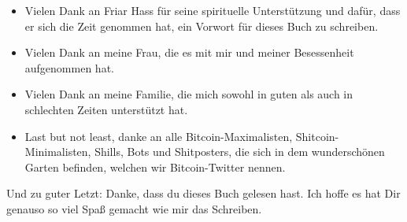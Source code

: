 \begin{itemize}
  \item Vielen Dank an Friar Hass für seine spirituelle Unterstützung und dafür, dass er sich die Zeit genommen hat, ein Vorwort für dieses Buch zu schreiben.
  \item Vielen Dank an meine Frau, die es mit mir und meiner Besessenheit aufgenommen hat.
  \item Vielen Dank an meine Familie, die mich sowohl in guten als auch in schlechten Zeiten unterstützt hat.
  \item Last but not least, danke an alle Bitcoin-Maximalisten, Shitcoin-Minimalisten, Shills, Bots und Shitposters, die sich in dem wunderschönen Garten befinden, welchen wir Bitcoin-Twitter nennen.
\end{itemize}

Und zu guter Letzt: Danke, dass du dieses Buch gelesen hast. Ich hoffe es hat Dir genauso so viel Spaß gemacht wie mir das Schreiben.
